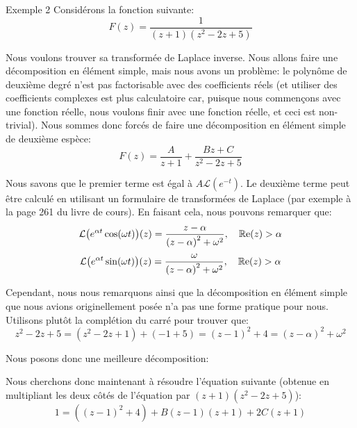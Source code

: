 \documentclass[a4paper]{article}
\begin{document}
\begin{parag}{Exemple 2}
    Considérons la fonction suivante: 
    \[F\left(z\right) = \frac{1}{\left(z+1\right)\left(z^2 - 2z + 5\right)}\]
    
    Nous voulons trouver sa transformée de Laplace inverse. Nous allons faire une décomposition en élément simple, mais nous avons un problème: le polynôme de deuxième degré n'est pas factorisable avec des coefficients réels (et utiliser des coefficients complexes est plus calculatoire car, puisque nous commençons avec une fonction réelle, nous voulons finir avec une fonction réelle, et ceci est non-trivial). Nous sommes donc forcés de faire une décomposition en élément simple de deuxième espèce: 
    \[F\left(z\right) = \frac{A}{z+1} + \frac{Bz + C}{z^2 - 2z + 5}\]

    Nous savons que le premier terme est égal à $A\mathcal{L}\left(e^{-t}\right)$. Le deuxième terme peut être calculé en utilisant un formulaire de transformées de Laplace (par exemple à la page 261 du livre de cours).  En faisant cela, nous pouvons remarquer que: 
    \[\mathcal{L}\left(e^{\alpha t} \cos\left(\omega t\right)\right)\left(z\right) = \frac{z - \alpha}{\left(z - \alpha\right)^2 + \omega^2}, \mathspace \cre\left(z\right) > \alpha\]
    \[\mathcal{L}\left(e^{\alpha t} \sin\left(\omega t\right)\right)\left(z\right) = \frac{\omega}{\left(z - \alpha\right)^2 + \omega^2}, \mathspace \cre\left(z\right) > \alpha\]
    
    Cependant, nous nous remarquons ainsi que la décomposition en élément simple que nous avions originellement posée n'a pas une forme pratique pour nous. Utilisons plutôt la complétion du carré pour trouver que: 
    \[z^2 - 2z + 5 = \left(z^2 - 2z + 1\right) + \left(- 1 + 5\right) = \left(z-1\right)^2 + 4 = \left(z - \alpha\right)^2  + \omega^2\]

    Nous posons donc une meilleure décomposition: 

    Nous cherchons donc maintenant à résoudre l'équation suivante (obtenue en multipliant les deux côtés de l'équation par $\left(z+1\right)\left(z^2 - 2z + 5\right)$):
    \[1 = \left(\left(z-1\right)^2 + 4\right) + B\left(z-1\right)\left(z+1\right) + 2C\left(z+1\right)\]
    

\end{parag}
\end{document}
